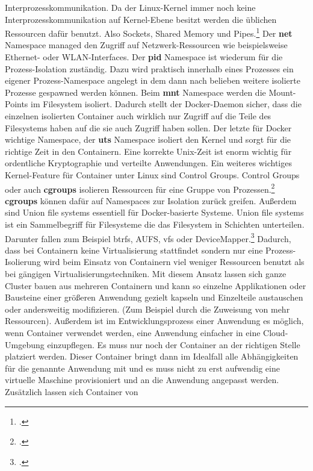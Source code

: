 \documentclass[titlepage]{report}
\begin{document}
Interprozesskommunikation. Da der Linux\hyp{}Kernel immer noch keine
Interprozesskommunikation auf Kernel\hyp{}Ebene besitzt werden die
üblichen Ressourcen dafür benutzt. Also Sockets, Shared Memory und
Pipes.\footcite{ipc} Der \textbf{net} Namespace managed den Zugriff auf
Netzwerk\hyp{}Ressourcen wie beispielsweise Ethernet\hyp{} oder
WLAN\hyp{}Interfaces. Der \textbf{pid} Namespace ist wiederum für die
Prozess\hyp{}Isolation zuständig. Dazu wird praktisch innerhalb eines
Prozesses ein eigener Prozess\hyp{}Namespace angelegt in dem dann nach
belieben weitere isolierte Prozesse gespawned werden können. Beim
\textbf{mnt} Namespace werden die Mount\hyp{}Points im Filesystem
isoliert. Dadurch stellt der Docker\hyp{}Daemon sicher, dass die
einzelnen isolierten Container auch wirklich nur Zugriff auf die Teile
des Filesystems haben auf die sie auch Zugriff haben sollen. Der letzte
für Docker wichtige Namespace, der \textbf{uts} Namespace isoliert den
Kernel und sorgt für die richtige Zeit in den Containern. Eine korrekte
Unix\hyp{}Zeit ist enorm wichtig für ordentliche Kryptographie und
verteilte Anwendungen. Ein weiteres wichtiges Kernel\hyp{}Feature für
Container unter Linux sind Control Groups. Control Groups oder auch
\textbf{cgroups} isolieren Ressourcen für eine Gruppe von
Prozessen.\footcite{cgroups} \textbf{cgroups} können dafür auf
Namespaces zur Isolation zurück greifen. Außerdem sind Union file
systems essentiell für Docker\hyp{}basierte Systeme. Union file systems
ist ein Sammelbegriff für Filesysteme die das Filesystem in Schichten
unterteilen. Darunter fallen zum Beispiel btrfs, AUFS, vfs oder
DeviceMapper.\footcite{docker}
Dadurch, dass bei Containern keine Virtualisierung stattfindet sondern
nur eine Prozess\hyp{}Isolierung wird beim Einsatz von Containern viel
weniger Ressourcen benutzt als bei gängigen Virtualisierungstechniken.
Mit diesem Ansatz lassen sich ganze Cluster bauen aus mehreren
Containern und kann so einzelne Applikationen oder Bausteine einer
größeren Anwendung gezielt kapseln und Einzelteile austauschen oder
andersweitig modifizieren. (Zum Beispiel durch die Zuweisung von mehr
Ressourcen). Außerdem ist im Entwicklungsprozess einer Anwendung es
möglich, wenn Container verwendet werden, eine Anwendung einfacher in
eine Cloud\hyp{}Umgebung einzupflegen. Es muss nur noch der Container an
der richtigen Stelle platziert werden. Dieser Container bringt dann im
Idealfall alle Abhängigkeiten für die genannte Anwendung mit und es muss
nicht zu erst aufwendig eine virtuelle Maschine provisioniert und an die
Anwendung angepasst werden. Zusätzlich lassen sich Container von
\end{document}
